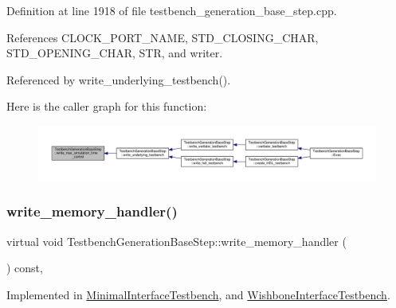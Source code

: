 Definition at line 1918 of file testbench\+\_\+generation\+\_\+base\+\_\+step.\+cpp.



References C\+L\+O\+C\+K\+\_\+\+P\+O\+R\+T\+\_\+\+N\+A\+ME, S\+T\+D\+\_\+\+C\+L\+O\+S\+I\+N\+G\+\_\+\+C\+H\+AR, S\+T\+D\+\_\+\+O\+P\+E\+N\+I\+N\+G\+\_\+\+C\+H\+AR, S\+TR, and writer.



Referenced by write\+\_\+underlying\+\_\+testbench().

Here is the caller graph for this function\+:
\nopagebreak
\begin{figure}[H]
\begin{center}
\leavevmode
\includegraphics[width=350pt]{dc/d02/classTestbenchGenerationBaseStep_aaca8d78023026f97ce9f8bbb3bfc5699_icgraph}
\end{center}
\end{figure}
\mbox{\label{classTestbenchGenerationBaseStep_a5c3f6e20a10e10fd2abded2de983d6ad}} 
\subsubsection{\texorpdfstring{write\+\_\+memory\+\_\+handler()}{write\_memory\_handler()}}
{\footnotesize\ttfamily virtual void Testbench\+Generation\+Base\+Step\+::write\+\_\+memory\+\_\+handler (\begin{DoxyParamCaption}{ }\end{DoxyParamCaption}) const\hspace{0.3cm}{\ttfamily [protected]}, {}}



Implemented in \hyperlink{classMinimalInterfaceTestbench_a7dd0527a7925eb55406a3db09adecf99}{Minimal\+Interface\+Testbench}, and \hyperlink{classWishboneInterfaceTestbench_aa94678609b7c8f3c402a0642776f9fda}{Wishbone\+Interface\+Testbench}.



